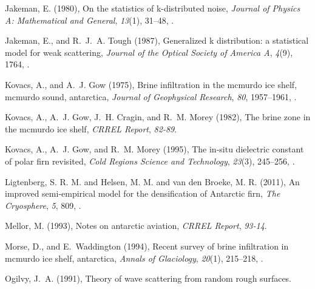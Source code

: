\documentclass[draft,grl]{agutex}
\begin{document}
\begin{article}
\begin{thebibliography}{40}
Jakeman, E. (1980), On the statistics of k-distributed noise, \textit{Journal
  of Physics A: Mathematical and General}, \textit{13}(1), 31--48,
  .

Jakeman, E., and R.~J.~A. Tough (1987), Generalized k distribution: a
  statistical model for weak scattering, \textit{Journal of the Optical Society
  of America A}, \textit{4}(9), 1764, .

Kovacs, A., and A.~J. Gow (1975), Brine infiltration in the mcmurdo ice shelf,
  mcmurdo sound, antarctica, \textit{Journal of Geophysical Research},
  \textit{80}, 1957--1961, .

Kovacs, A., A.~J. Gow, J.~H. Cragin, and R.~M. Morey (1982), The brine zone in
  the mcmurdo ice shelf, \textit{CRREL Report}, \textit{82-89}.

Kovacs, A., A.~J. Gow, and R.~M. Morey (1995), The in-situ dielectric constant
  of polar firn revisited, \textit{Cold Regions Science and Technology},
  \textit{23}(3), 245--256, .

{Ligtenberg, S. R. M. and Helsen, M. M. and van den Broeke, M. R.} ({2011}),
  {An improved semi-empirical model for the densification of Antarctic firn},
  \textit{{The Cryosphere}}, \textit{{5}}, {809},
  .

Mellor, M. (1993), Notes on antarctic aviation, \textit{CRREL Report},
  \textit{93-14}.

Morse, D., and E.~Waddington (1994), Recent survey of brine infiltration in
  mcmurdo ice shelf, antarctica, \textit{Annals of Glaciology}, \textit{20}(1),
  215--218, .

Ogilvy, J.~A. (1991), Theory of wave scattering from random rough surfaces.


\end{thebibliography}
\end{article}
\end{document}
